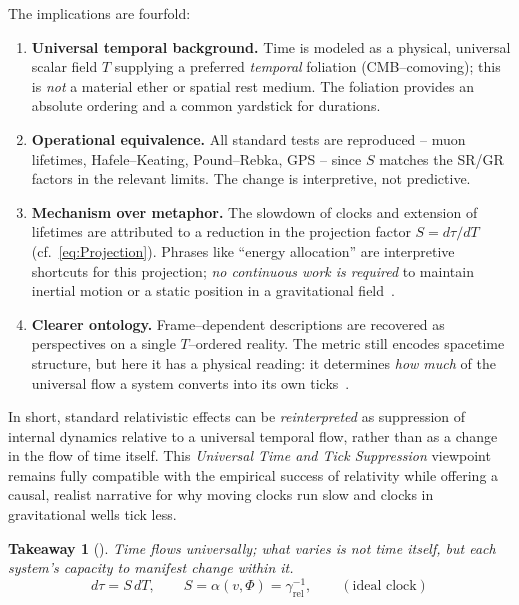 \documentclass[12pt]{article}
\theoremstyle{plain}
\newcommand{\gammarel}{\gamma_{\!\mathrm{rel}}}
\newtheorem{innerTakeaway}{Takeaway}
\newenvironment{takeaway}[1][]{
  \begin{mdframed}[linewidth=0.6pt,roundcorner=4pt]
  \begin{innerTakeaway}[#1]\label{takeaway:universal–flow}
}{\end{innerTakeaway}\end{mdframed}}
\begin{document}
\medskip
\noindent
The implications are fourfold:
\begin{enumerate}
  \item \textbf{Universal temporal background.} Time is modeled as a physical, universal scalar field $T$ supplying a preferred \emph{temporal} foliation (CMB–comoving); this is \emph{not} a material ether or spatial rest medium. The foliation provides an absolute ordering and a common yardstick for durations.
  \item \textbf{Operational equivalence.} All standard tests are reproduced – muon lifetimes, Hafele–Keating, Pound–Rebka, GPS – since $S$ matches the SR/GR factors in the relevant limits. The change is interpretive, not predictive.~\cite{Will2014,HafeleKeating1972a,HafeleKeating1972b,PoundRebka1960,Bailey1977,Ashby2003}
  \item \textbf{Mechanism over metaphor.} The slowdown of clocks and extension of lifetimes are attributed to a reduction in the projection factor $S=d\tau/dT$ (cf.~\eqref{eq:Projection}). Phrases like “energy allocation” are interpretive shortcuts for this projection; \emph{no continuous work is required} to maintain inertial motion or a static position in a gravitational field~\cite{HafeleKeating1972a,HafeleKeating1972b}.
  \item \textbf{Clearer ontology.} Frame–dependent descriptions are recovered as perspectives on a single $T$–ordered reality. The metric still encodes spacetime structure, but here it has a physical reading: it determines \emph{how much} of the universal flow a system converts into its own ticks~\cite{Carroll2004}.
\end{enumerate}

\noindent
In short, standard relativistic effects can be \emph{reinterpreted} as suppression of internal dynamics relative to a universal temporal flow, rather than as a change in the flow of time itself. This \emph{Universal Time and Tick Suppression} viewpoint remains fully compatible with the empirical success of relativity while offering a causal, realist narrative for why moving clocks run slow and clocks in gravitational wells tick less.

\begin{takeaway}\label{takeaway:universal–flow}
\emph{Time flows universally; what varies is not time itself, but each system’s capacity to manifest change within it.}
\begin{equation}
\label{eq:UniversalFlowBox}
\boxed{\, d\tau = S\,dT,\qquad S=\alpha(v,\Phi)=\gammarel^{-1},\qquad (\text{ideal clock})\,}
\end{equation}
\end{takeaway}
\end{document}
